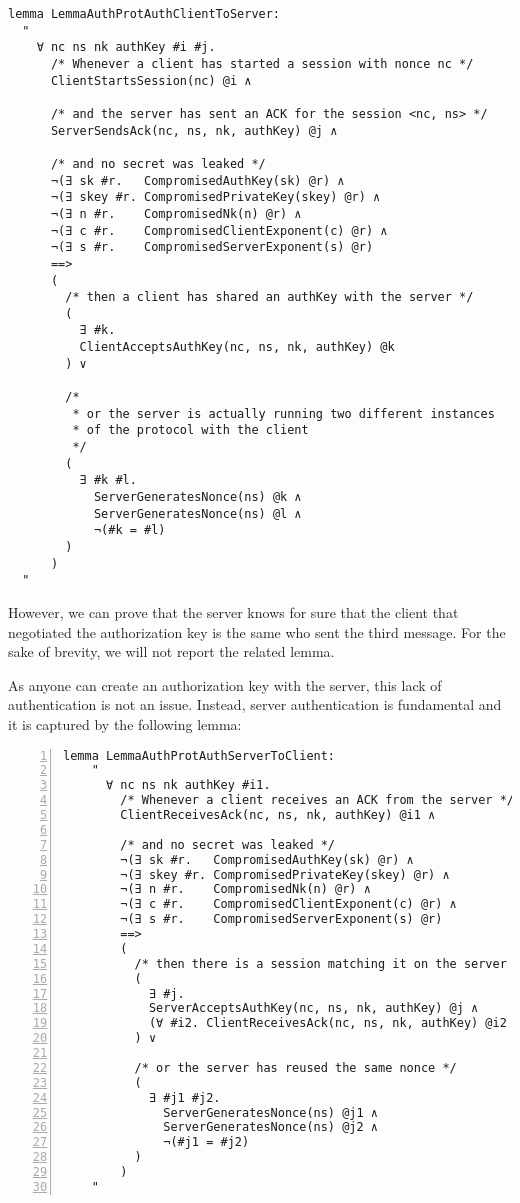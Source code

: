 \begin{lstlisting}
lemma LemmaAuthProtAuthClientToServer:
  "
    ∀ nc ns nk authKey #i #j.
      /* Whenever a client has started a session with nonce nc */
      ClientStartsSession(nc) @i ∧

      /* and the server has sent an ACK for the session <nc, ns> */
      ServerSendsAck(nc, ns, nk, authKey) @j ∧

      /* and no secret was leaked */          
      ¬(∃ sk #r.   CompromisedAuthKey(sk) @r) ∧
      ¬(∃ skey #r. CompromisedPrivateKey(skey) @r) ∧
      ¬(∃ n #r.    CompromisedNk(n) @r) ∧
      ¬(∃ c #r.    CompromisedClientExponent(c) @r) ∧
      ¬(∃ s #r.    CompromisedServerExponent(s) @r)
      ==>
      (
        /* then a client has shared an authKey with the server */
        (
          ∃ #k.
          ClientAcceptsAuthKey(nc, ns, nk, authKey) @k
        ) ∨

        /* 
         * or the server is actually running two different instances
         * of the protocol with the client
         */
        (
          ∃ #k #l.
            ServerGeneratesNonce(ns) @k ∧
            ServerGeneratesNonce(ns) @l ∧
            ¬(#k = #l)
        )
      )
  "
\end{lstlisting}

However, we can prove that the server knows for sure that the client that negotiated the authorization key is the same who sent the third message. For the sake of brevity, we will not report the related lemma.

As anyone can create an authorization key with the server, this lack of authentication is not an issue. Instead, server authentication is fundamental and it is captured by the following lemma:
\begin{lstlisting}[numbers=left]
  lemma LemmaAuthProtAuthServerToClient:
    "
      ∀ nc ns nk authKey #i1.
        /* Whenever a client receives an ACK from the server */
        ClientReceivesAck(nc, ns, nk, authKey) @i1 ∧
        
        /* and no secret was leaked */
        ¬(∃ sk #r.   CompromisedAuthKey(sk) @r) ∧
        ¬(∃ skey #r. CompromisedPrivateKey(skey) @r) ∧
        ¬(∃ n #r.    CompromisedNk(n) @r) ∧
        ¬(∃ c #r.    CompromisedClientExponent(c) @r) ∧
        ¬(∃ s #r.    CompromisedServerExponent(s) @r)
        ==>
        (
          /* then there is a session matching it on the server */
          ( 
            ∃ #j.
            ServerAcceptsAuthKey(nc, ns, nk, authKey) @j ∧
            (∀ #i2. ClientReceivesAck(nc, ns, nk, authKey) @i2 ==> #i1 = #i2)
          ) ∨

          /* or the server has reused the same nonce */
          (
            ∃ #j1 #j2.
              ServerGeneratesNonce(ns) @j1 ∧
              ServerGeneratesNonce(ns) @j2 ∧
              ¬(#j1 = #j2)
          )
        )
    "
\end{lstlisting}

